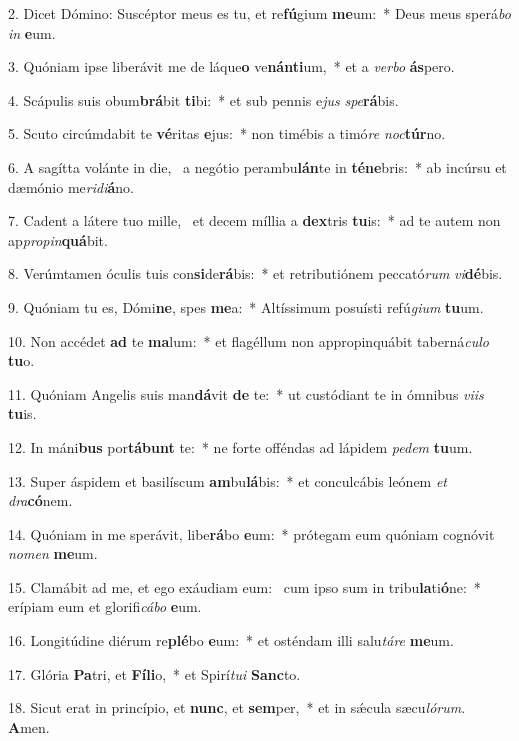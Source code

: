 2. Dicet Dómino: Suscéptor meus es tu, et re\textbf{fú}gium \textbf{me}um:~*  Deus meus sperá\textit{bo} \textit{in} \textbf{e}um.\

3. Quóniam ipse liberávit me de láque\textbf{o} ve\textbf{nán}\textbf{ti}um,~*  et a \textit{ver}\textit{bo} \textbf{ás}pero.\

4. Scápulis suis obum\textbf{brá}bit \textbf{ti}bi:~*  et sub pennis e\textit{jus} \textit{spe}\textbf{rá}bis.\

5. Scuto circúmdabit te \textbf{vé}ritas \textbf{e}jus:~*  non timébis a timó\textit{re} \textit{noc}\textbf{túr}no.\

6. A sagítta volánte in die, \dag\  a negótio perambu\textbf{lán}te in \textbf{té}\textbf{ne}bris:~*  ab incúrsu et dæmónio me\textit{ri}\textit{di}\textbf{á}no.\

7. Cadent a látere tuo mille, \dag\  et decem míllia a \textbf{dex}tris \textbf{tu}is:~*  ad te autem non ap\textit{pro}\textit{pin}\textbf{quá}bit.\

8. Verúmtamen óculis tuis con\textbf{si}de\textbf{rá}bis:~*  et retributiónem peccató\textit{rum} \textit{vi}\textbf{dé}bis.\

9. Quóniam tu es, Dómi\textbf{ne}, spes \textbf{me}a:~*  Altíssimum posuísti refú\textit{gi}\textit{um} \textbf{tu}um.\

10. Non accédet \textbf{ad} te \textbf{ma}lum:~*  et flagéllum non appropinquábit taberná\textit{cu}\textit{lo} \textbf{tu}o.\

11. Quóniam Angelis suis man\textbf{dá}vit \textbf{de} te:~*  ut custódiant te in ómnibus \textit{vi}\textit{is} \textbf{tu}is.\

12. In máni\textbf{bus} por\textbf{tá}\textbf{bunt} te:~*  ne forte offéndas ad lápidem \textit{pe}\textit{dem} \textbf{tu}um.\

13. Super áspidem et basilíscum \textbf{am}bu\textbf{lá}bis:~*  et conculcábis leónem \textit{et} \textit{dra}\textbf{có}nem.\

14. Quóniam in me sperávit, libe\textbf{rá}bo \textbf{e}um:~*  prótegam eum quóniam cognóvit \textit{no}\textit{men} \textbf{me}um.\

15. Clamábit ad me, et ego exáudiam eum: \dag\  cum ipso sum in tribu\textbf{la}ti\textbf{ó}ne:~*  erípiam eum et glorifi\textit{cá}\textit{bo} \textbf{e}um.\

16. Longitúdine diérum re\textbf{plé}bo \textbf{e}um:~*  et osténdam illi salu\textit{tá}\textit{re} \textbf{me}um.\

17. Glória \textbf{Pa}tri, et \textbf{Fí}\textbf{li}o,~*  et Spirí\textit{tu}\textit{i} \textbf{Sanc}to.\

18. Sicut erat in princípio, et \textbf{nunc}, et \textbf{sem}per,~*  et in sǽcula sæcu\textit{ló}\textit{rum}. \textbf{A}men.\

